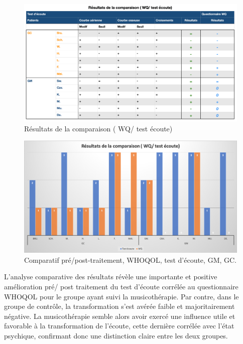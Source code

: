 

  \begin{figure}
  	\centering
  	\includegraphics[width=\linewidth]{images/graphiques/comparaison_pre_post.png}
  	\caption[Résultats de la comparaison ( WQ/ test écoute)]{Résultats de la comparaison ( WQ/ test 
  	écoute)}
  	
  \end{figure}
  \begin{figure}
  	\centering
  	\includegraphics[width=\linewidth]{images/graphiques/comparatifWQecoute.png}
  	\caption[Comparatif résultats pré/post]{Comparatif
  		pré/post-traitement, WHOQOL, test d'écoute, GM, GC.}
  	
  \end{figure}
  
  L'analyse comparative des résultats révèle une importante et positive amélioration pré/ post traitement 
  du test d'écoute corrélée au questionnaire WHOQOL pour le groupe ayant suivi la musicothérapie. Par 
  contre, dans  le groupe de contrôle, la 
  transformation s'est avérée faible et majoritairement négative. La musicothérapie semble alors avoir 
  exercé une influence utile et favorable à la transformation de l'écoute, cette dernière corrélée avec l'état 
  psychique, confirmant donc une distinction claire entre les deux groupes. 

